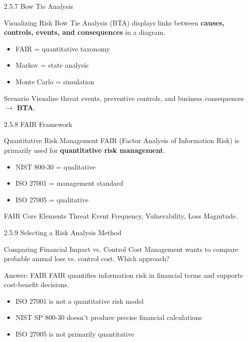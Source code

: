 \documentclass{beamer}
\begin{document}
	\begin{frame}{2.5.7 Bow Tie Analysis}
		\begin{block}{Visualizing Risk}
			Bow Tie Analysis (BTA) displays links between \textbf{causes, controls, events, and consequences} in a diagram.
		\end{block}
		\begin{itemize}
			\item FAIR = quantitative taxonomy
			\item Markov = state analysis
			\item Monte Carlo = simulation
		\end{itemize}
		\begin{exampleblock}{Scenario}
			Visualize threat events, preventive controls, and business consequences $\rightarrow$ \textbf{BTA}.
		\end{exampleblock}
	\end{frame}
	
	\begin{frame}{2.5.8 FAIR Framework}
		\begin{block}{Quantitative Risk Management}
			FAIR (Factor Analysis of Information Risk) is primarily used for \textbf{quantitative risk management}.
		\end{block}
		\begin{itemize}
			\item NIST 800-30 = qualitative
			\item ISO 27001 = management standard
			\item ISO 27005 = qualitative
		\end{itemize}
		\begin{exampleblock}{FAIR Core Elements}
			Threat Event Frequency, Vulnerability, Loss Magnitude.
		\end{exampleblock}
	\end{frame}
	
	\begin{frame}{2.5.9 Selecting a Risk Analysis Method}
		\begin{block}{Comparing Financial Impact vs. Control Cost}
			Management wants to compare probable annual loss vs. control cost. Which approach?
		\end{block}
		\begin{exampleblock}{Answer: FAIR}
			FAIR quantifies information risk in financial terms and supports cost-benefit decisions.
		\end{exampleblock}
		\begin{itemize}
			\item ISO 27001 is not a quantitative risk model
			\item NIST SP 800-30 doesn't produce precise financial calculations
			\item ISO 27005 is not primarily quantitative
		\end{itemize}
	\end{frame}
	
\end{document}
